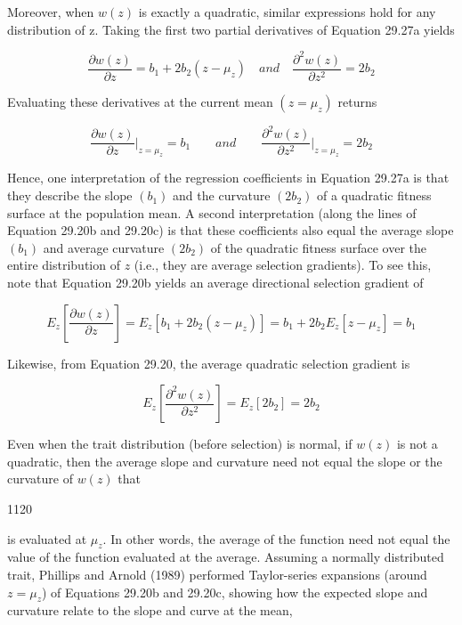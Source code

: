 \documentclass{article}
\begin{document}
Moreover, when  $ w(z) $ is exactly a quadratic, similar expressions hold for any distribution of z. Taking the first two partial derivatives of Equation 29.27a yields

\begin{equation}
\frac{\partial w(z)}{\partial z}=b_{1}+2b_{2}(z-\mu_{z})\quad and\quad\frac{\partial^{2}w(z)}{\partial z^{2}}=2b_{2}
\tag{29.30a}
\label{eq:29_30a}
\end{equation}

Evaluating these derivatives at the current mean  $ (z = \mu_z) $ returns

\begin{equation}
\frac{\partial w(z)}{\partial z}\bigg|_{z=\mu_{z}}=b_{1}\qquad and\qquad\frac{\partial^{2}w(z)}{\partial z^{2}}\bigg|_{z=\mu_{z}}=2b_{2}
\tag{29.30b}
\label{eq:29_30b}
\end{equation}

Hence, one interpretation of the regression coefficients in Equation 29.27a is that they describe the slope  $ (b_1) $ and the curvature  $ (2b_2) $ of a quadratic fitness surface at the population mean. A second interpretation (along the lines of Equation 29.20b and 29.20c) is that these coefficients also equal the average slope  $ (b_1) $ and average curvature  $ (2b_2) $ of the quadratic fitness surface over the entire distribution of  $ z $ (i.e., they are average selection gradients). To see this, note that Equation 29.20b yields an average directional selection gradient of

\begin{equation}
E_{z}\left[\frac{\partial w(z)}{\partial z}\right]=E_{z}\left[b_{1}+2b_{2}(z-\mu_{z})\right]=b_{1}+2b_{2}E_{z}\left[z-\mu_{z}\right]=b_{1}
\tag{29.30c}
\label{eq:29_30c}
\end{equation}

Likewise, from Equation 29.20, the average quadratic selection gradient is

\begin{equation}
E_{z}\left[\frac{\partial^{2}w(z)}{\partial z^{2}}\right]=E_{z}\left[2b_{2}\right]=2b_{2}
\end{equation}

Even when the trait distribution (before selection) is normal, if  $ w(z) $ is not a quadratic, then the average slope and curvature need not equal the slope or the curvature of  $ w(z) $ that

1120

is evaluated at  $ \mu_{z} $. In other words, the average of the function need not equal the value of the function evaluated at the average. Assuming a normally distributed trait, Phillips and Arnold (1989) performed Taylor-series expansions (around  $ z = \mu_{z} $) of Equations 29.20b and 29.20c, showing how the expected slope and curvature relate to the slope and curve at the mean,
\end{document}
